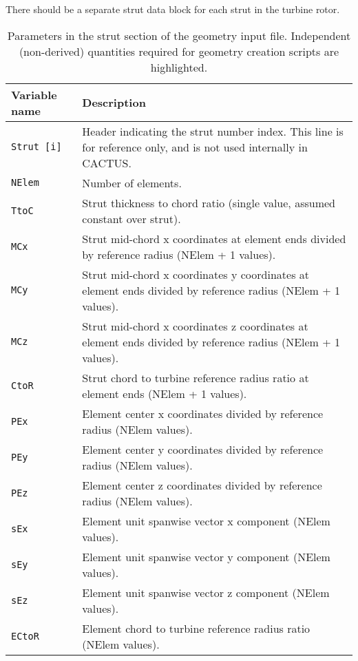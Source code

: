 There should be a separate strut data block for each strut in the turbine rotor.

\begin{longtable}{p{}p{}}
\caption{Parameters in the strut section of the geometry input file. Independent (non-derived) quantities required for geometry creation scripts are highlighted.} \label{tbl:geometry_input_params_strut} \\
\toprule
Variable name & Description \\ \midrule
\texttt{Strut [i]} & Header indicating the strut number index. This line is for reference only, and is not used internally in CACTUS. \\
\rowcolor{highlightcolor}\texttt{NElem}   & Number of elements. \\
\rowcolor{highlightcolor}\texttt{TtoC}    & Strut thickness to chord ratio (single value, assumed constant over strut). \\
\rowcolor{highlightcolor}\texttt{MCx}     & Strut mid-chord x coordinates at element ends divided by reference radius (NElem + 1 values). \\
\rowcolor{highlightcolor}\texttt{MCy}     & Strut mid-chord x coordinates y coordinates at element ends divided by reference radius (NElem + 1 values). \\
\rowcolor{highlightcolor}\texttt{MCz}     & Strut mid-chord x coordinates z coordinates at element ends divided by reference radius (NElem + 1 values). \\
\rowcolor{highlightcolor}\texttt{CtoR}    & Strut chord to turbine reference radius ratio at element ends (NElem + 1 values). \\
\texttt{PEx}     & Element center x coordinates divided by reference radius (NElem values). \\
\texttt{PEy}     & Element center y coordinates divided by reference radius (NElem values). \\
\texttt{PEz}     & Element center z coordinates divided by reference radius (NElem values). \\
\texttt{sEx}     & Element unit spanwise vector x component (NElem values). \\
\texttt{sEy}     & Element unit spanwise vector y component (NElem values). \\
\texttt{sEz}     & Element unit spanwise vector z component (NElem values). \\
\texttt{ECtoR}   & Element chord to turbine reference radius ratio (NElem values). \\

\end{longtable}
